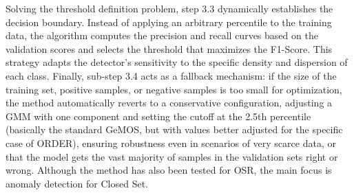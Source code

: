 Solving the threshold definition problem, step 3.3 dynamically establishes the decision boundary. Instead of applying an arbitrary percentile to the training data, the algorithm computes the precision and recall curves based on the validation scores and selects the threshold that maximizes the F1-Score. This strategy adapts the detector's sensitivity to the specific density and dispersion of each class. Finally, sub-step 3.4 acts as a fallback mechanism: if the size of the training set, positive samples, or negative samples is too small for optimization, the method automatically reverts to a conservative configuration, adjusting a \ac{GMM} with one component and setting the cutoff at the 2.5th percentile (basically the standard \ac{GeMOS}, but with values better adjusted for the specific case of \ac{ORDER}), ensuring robustness even in scenarios of very scarce data, or that the model gets the vast majority of samples in the validation sets right or wrong. Although the method has also been tested for OSR, the main focus is anomaly detection for Closed Set.